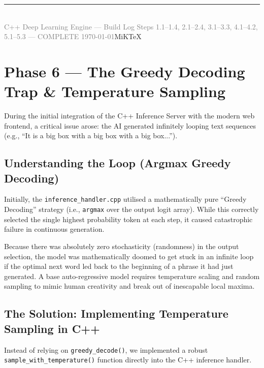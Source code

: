 \documentclass[12pt, a4paper]{article}
\begin{document}
\vfill
\begin{center}
  \textcolor{accentgold}{\rule{8cm}{0.8pt}}\\[0.4em]
  {\small\textcolor{gray}%
    {C++ Deep Learning Engine --- Build Log \textbar{}
     Steps 1.1--1.4, 2.1--2.4, 3.1--3.3, 4.1--4.2, 5.1--5.3 --- COMPLETE \textbar{}
     \today}}MiKTeX
\end{center}

\newpage
\section{Phase 6 --- The Greedy Decoding Trap \& Temperature Sampling}

\begin{tcolorbox}[designbox, title={Phase 6 Problem Statement}]
  During the initial integration of the C++ Inference Server with the modern web frontend, a critical issue arose: the AI generated infinitely looping text sequences (e.g., ``It is a big box with a big box with a big box...'').
\end{tcolorbox}

\subsection{Understanding the Loop (Argmax Greedy Decoding)}
Initially, the \texttt{inference\_handler.cpp} utilised a mathematically pure ``Greedy Decoding'' strategy (i.e., \texttt{argmax} over the output logit array). While this correctly selected the single highest probability token at each step, it caused catastrophic failure in continuous generation. 

Because there was absolutely zero stochasticity (randomness) in the output selection, the model was mathematically doomed to get stuck in an infinite loop if the optimal next word led back to the beginning of a phrase it had just generated. A base auto-regressive model requires temperature scaling and random sampling to mimic human creativity and break out of inescapable local maxima.

\subsection{The Solution: Implementing Temperature Sampling in C++}
Instead of relying on \texttt{greedy\_decode()}, we implemented a robust \texttt{sample\_with\_temperature()} function directly into the C++ inference handler. 
\end{document}
